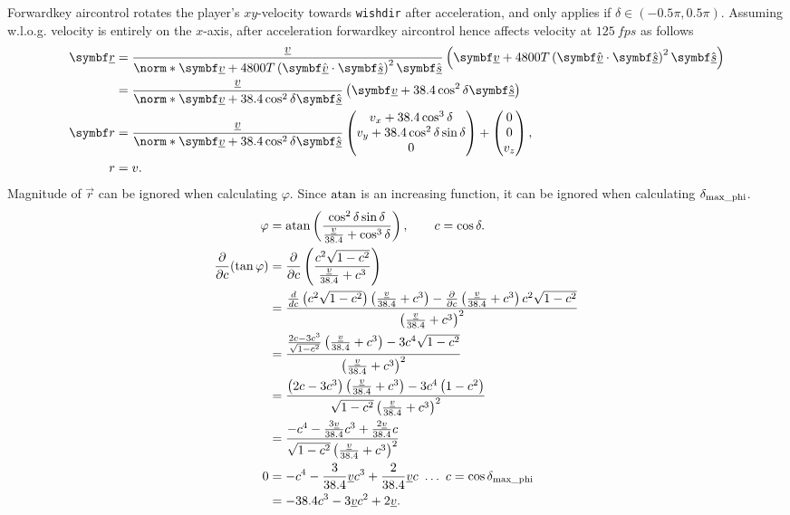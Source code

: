 Forwardkey aircontrol rotates the player's $xy$-velocity towards \texttt{wishdir} after acceleration, and only applies if $\delta \in (-0.5\pi, 0.5\pi)$.
Assuming w.l.o.g. velocity is entirely on the $x$-axis, after acceleration forwardkey aircontrol hence affects velocity at $\qty{125}{fps}$ as follows
\begin{align*}
\vec{\flat{r}} &= \frac{\flat{v}}{\norm*{\vec{\flat{v}} + 4800T\left(\uvec{\flat{v}}\cdot \uvec{\flat{s}} \right)^2\uvec{\flat{s}}}} \left(\vec{\flat{v}} + 4800T\left(\uvec{\flat{v}}\cdot \uvec{\flat{s}} \right)^2\uvec{\flat{s}} \right)\\
&= \frac{\flat{v}}{\norm*{\vec{\flat{v}} + 38.4\cos^2 \delta\uvec{\flat{s}}}} \left(\vec{\flat{v}} + 38.4\cos^2 \delta\uvec{\flat{s}} \right)\\
\vec{r} &= \frac{\flat{v}}{\norm*{\vec{\flat{v}} + 38.4\cos^2 \delta\uvec{\flat{s}}}} \begin{pmatrix}
v_x + 38.4\cos^3 \delta \\ v_y + 38.4\cos^2 \delta \sin\delta \\ 0
\end{pmatrix} + \begin{pmatrix}
0 \\ 0 \\ v_z
\end{pmatrix},\\
r &= v.
\end{align*}
Magnitude of $\vec{r}$ can be ignored when calculating $\varphi$. Since $\operatorname{atan}$ is an increasing function, it can be ignored when calculating $\delta_{\operatorname{max\_phi}}$.
\begin{align*}
\varphi &= \atan\left(\frac{\cos^2 \delta \sin\delta}{\frac{\flat{v}}{38.4} + \cos^3 \delta} \right),\qquad c = \cos\delta.\\
\frac{\partial}{\partial c}(\tan\varphi) &= \frac{\partial}{\partial c}\left(\frac{c^2 \sqrt{1 - c^2}}{\frac{\flat{v}}{38.4} + c^3} \right)\\
&= \frac{\frac{\diff}{\diff c}\left(c^2 \sqrt{1 - c^2} \right) \left(\frac{\flat{v}}{38.4} + c^3 \right) - \frac{\partial}{\partial c}\left(\frac{\flat{v}}{38.4} + c^3 \right) c^2 \sqrt{1 - c^2}}{\left(\frac{\flat{v}}{38.4} + c^3 \right)^2}\\
&= \frac{\frac{2c - 3c^3}{\sqrt{1 - c^2}} \left(\frac{\flat{v}}{38.4} + c^3 \right) - 3c^4 \sqrt{1 - c^2}}{\left(\frac{\flat{v}}{38.4} + c^3 \right)^2}\\
&= \frac{\left(2c - 3c^3 \right) \left(\frac{\flat{v}}{38.4} + c^3 \right) - 3c^4 \left(1 - c^2 \right)}{\sqrt{1 - c^2} \left(\frac{\flat{v}}{38.4} + c^3 \right)^2}\\
&= \frac{-c^4 - \frac{3\flat{v}}{38.4}c^3 + \frac{2\flat{v}}{38.4}c}{\sqrt{1 - c^2} \left(\frac{\flat{v}}{38.4} + c^3 \right)^2}\\
0 &= -c^4 - \frac{3}{38.4}\flat{v}c^3 + \frac{2}{38.4}\flat{v}c\ \ldots\ c = \cos\delta_{\maxphi}\\
&= -38.4c^3 - 3\flat{v}c^2 + 2\flat{v}.
\end{align*}
